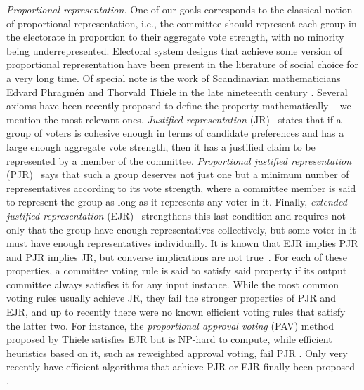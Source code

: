 \emph{Proportional representation.}
One of our goals corresponds to the classical notion of proportional representation, i.e., the committee should represent each group in the electorate in proportion to their aggregate vote strength, with no minority being underrepresented. 
Electoral system designs that achieve some version of proportional representation have been present in the literature of social choice for a very long time. Of special note is the work of Scandinavian mathematicians Edvard Phragm\'{e}n and Thorvald Thiele in the late nineteenth century \cite{phragmen1894methode, phragmen1895proportionella, phragmen1896theorie, phragmen1899till, thiele1895om, janson2016phragmen}. 
Several axioms have been recently proposed to define the property mathematically -- we mention the most relevant ones. 
\emph{Justified representation} (JR)~\cite{aziz2017justified} states that if a group of voters is cohesive enough in terms of candidate preferences and has a large enough aggregate vote strength, then it has a justified claim to be represented by a member of the committee.
\emph{Proportional justified representation} (PJR)~\cite{sanchez2017proportional} says that such a group deserves not just one but a minimum number of representatives according to its vote strength, where a committee member is said to represent the group as long as it represents any voter in it.
Finally, \emph{extended justified representation} (EJR)~\cite{aziz2017justified} strengthens this last condition and requires not only that the group have enough representatives collectively, but some voter in it must have enough representatives individually.
It is known that EJR implies PJR and PJR implies JR, but converse implications are not true~\cite{sanchez2017proportional}. %
For each of these properties, a committee voting rule is said to satisfy said property if its output committee always satisfies it for any input instance. 
While the most common voting rules usually achieve JR, they fail the stronger properties of PJR and EJR, and up to recently there were no known efficient voting rules that satisfy the latter two. 
For instance, the \emph{proportional approval voting} (PAV) method \cite{thiele1895om, janson2016phragmen} proposed by Thiele satisfies EJR but is NP-hard to compute, while efficient heuristics based on it, such as reweighted approval voting, fail PJR \cite{aziz2014computational, skowron2016finding, aziz2017justified}. 
Only very recently have efficient algorithms that achieve PJR or EJR finally been proposed \cite{brill2017phragmen, sanchez2016maximin, aziz2018complexity, peters2019proportionality}. 

